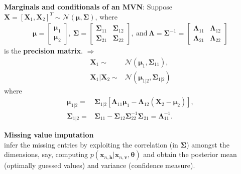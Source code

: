 \textbf{Marginals and conditionals of an MVN}: 
Suppose $\bm{X}=[\bm{X}_1,\bm{X}_2]^T\sim\mathcal{N}(\bm{\mu},\bm{\Sigma})$, where
\begin{gather}
    \bm{\mu}=\left[\begin{array}{c}
        \bm{\mu}_1 \\
        \bm{\mu}_2
    \end{array}\right],~
    \bm{\Sigma}=\left[\begin{array}{cc}
        \bm{\Sigma}_{11} & \bm{\Sigma}_{12} \\
        \bm{\Sigma}_{21} & \bm{\Sigma}_{22}
    \end{array}\right],~\text{and}~
    \bm{\Lambda}
    =\bm{\Sigma}^{-1}=\left[\begin{array}{cc}
        \bm{\Lambda}_{11} & \bm{\Lambda}_{12} \\
        \bm{\Lambda}_{21} & \bm{\Lambda}_{22}
    \end{array}\right]
\end{gather}
is the \textbf{precision matrix}.
$\Rightarrow$
\begin{align}
    \bm{X}_1
    \sim& \mathcal{N}(\bm{\mu}_1,\bm{\Sigma}_{11}),\\
    \bm{X}_1|\bm{X}_2
    \sim& \mathcal{N}
    (\bm{\mu}_{1|2},\bm{\Sigma}_{1|2})
\end{align}
where 
\begin{align}
    \bm{\mu}_{1|2}
    =& \bm{\Sigma}_{1|2}
    [\bm{\Lambda}_{11}\bm{\mu}_1
    -\bm{\Lambda}_{12}(\bm{X}_2-\bm{\mu}_2)],\\
    \bm{\Sigma}_{1|2}
    =& \bm{\Sigma}_{11}
    -\bm{\Sigma}_{12}\bm{\Sigma}_{22}^{-1}\bm{\Sigma}_{21}
    =\bm{\Lambda}_{11}^{-1}.
\end{align}


\begin{example}
    \textbf{Missing value imputation}\\
    infer the missing entries 
    by exploiting the correlation (in $\bm{\Sigma}$) amongst the dimensions,
    say, computing 
    $p(\bm{x}_{n,\bm{h}}|\bm{x}_{n,\bm{v}},\bm{\theta})$
    and obtain the posterior mean (optimally guessed values) and variance (confidence measure).
\end{example}


